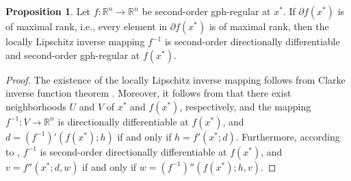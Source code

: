 \documentclass[11pt]{article}
\theoremstyle{definition}
\newtheorem{proposition}[theorem]{Proposition}
\theoremstyle{remark}
\numberwithin{equation}{section}
\begin{document}
\begin{proposition}\label{prop f^-1}
  Let $f:\mathbb{R}^n\to \mathbb{R}^n$ be
   second-order gph-regular at $x^*$. If $\partial f(x^*)$ is of maximal rank,  i.e., every element in $\partial f(x^*)$ is of maximal rank, then the locally Lipschitz
  inverse mapping $f^{-1}$ is second-order directionally differentiable and second-order gph-regular at $f(x^*)$.
\end{proposition}
\begin{proof}
    The existence of the locally Lipschitz inverse mapping follows from Clarke inverse function theorem \cite[Theorem 7.1.1]{Clarke}. Moreover, it  follows  from \cite[Lemma 2]{Kummer} that there exist
  neighborhoods $U$ and $V$ of $x^*$ and $f(x^*)$, respectively, and the mapping $f^{-1}:V\to
  \mathbb{R}^n$ is  directionally differentiable at $f(x^*)$, and $d=(f^{-1})'(f(x^*);h)$ if and only if $h=f'(x^*;d)$. Furthermore,  according to \cite{Yin 25}, $f^{-1}$ is second-order directionally differentiable at $f(x^*)$, and $v=f''(x^*;d,w)$ if and only if $w=(f^{-1})''(f(x^*);h,v)$.


\end{proof}
\end{document}
